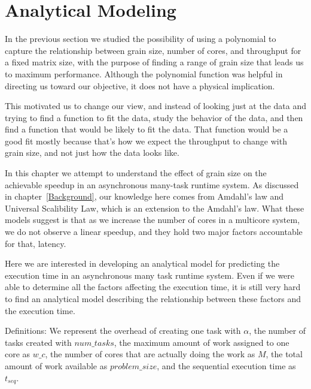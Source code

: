 \section{Analytical Modeling}
In the previous section we studied the possibility of using a polynomial to capture the relationship between grain size, number of cores, and throughput for a fixed matrix size, with the purpose of finding a range of grain size that leads us to maximum performance. 
Although the polynomial function was helpful in directing us toward our objective, it does not have a physical implication. 

This motivated us to change our view, and instead of looking just at the data and trying to find a function to fit the data, study the behavior of the data, and then find a function that would be likely to fit the data. That function would be a good fit mostly because that's how we expect the throughput to change with grain size, and not just how the data looks like.   

In this chapter we attempt to understand the effect of grain size on the achievable speedup in an asynchronous many-task runtime system. As discussed in chapter~\ref{Background}, our knowledge here comes from Amdahl's law and Universal Scalibility Law, which is an extension to the Amdahl's law. What these models suggest is that as we increase the number of cores in a multicore system, we do not observe a linear speedup, and they hold two major factors accountable for that, latency.

Here we are interested in developing an analytical model for predicting the execution time in an asynchronous many task runtime system. Even if we were able to determine all the factors affecting the execution time, it is still very hard to find an analytical model describing the relationship between these factors and the execution time.   

Definitions:
We represent the overhead of creating one task with $\alpha$, the number of tasks created with $num\_{tasks}$, the maximum amount of work assigned to one core as $w\_c$, the number of cores that are actually doing the work as $M$, the total amount of work available as $problem\_{size}$, and the sequential execution time as $t_{seq}$.

